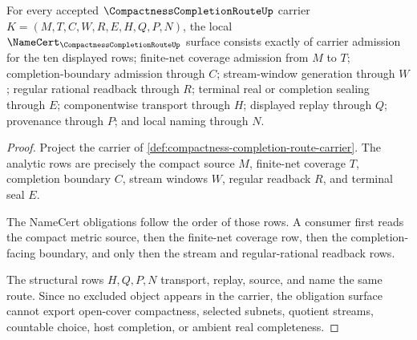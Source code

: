 \begin{theorem}
\label{thm:compactness-completion-route-namecert-obligations}
For every accepted $\CompactnessCompletionRouteUp$ carrier $K=(M,T,C,W,R,E,H,Q,P,N)$, the local $\NameCert_{\CompactnessCompletionRouteUp}$ surface consists exactly of carrier admission for the ten displayed rows; finite-net coverage admission from $M$ to $T$; completion-boundary admission through $C$; stream-window generation through $W$; regular rational readback through $R$; terminal real or completion sealing through $E$; componentwise transport through $H$; displayed replay through $Q$; provenance through $P$; and local naming through $N$.
\end{theorem}
\begin{proof}
Project the carrier of \autoref{def:compactness-completion-route-carrier}. The analytic rows are precisely the compact source $M$, finite-net coverage $T$, completion boundary $C$, stream windows $W$, regular readback $R$, and terminal seal $E$.

The NameCert obligations follow the order of those rows. A consumer first reads the compact metric source, then the finite-net coverage row, then the completion-facing boundary, and only then the stream and regular-rational readback rows.

The structural rows $H,Q,P,N$ transport, replay, source, and name the same route. Since no excluded object appears in the carrier, the obligation surface cannot export open-cover compactness, selected subnets, quotient streams, countable choice, host completion, or ambient real completeness.
\end{proof}


